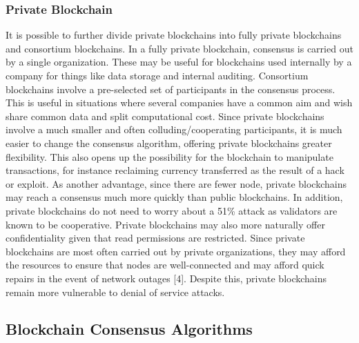 \documentclass[11pt]{article}
\begin{document}
\subsubsection{Private Blockchain}
\label{sec:orga1ba3cc}
It is possible to further divide private blockchains into fully private blockchains and consortium blockchains. In a fully private blockchain, consensus is carried out by a single organization. These may be useful for blockchains used internally by a company for things like data storage and internal auditing. Consortium blockchains involve a pre-selected set of participants in the consensus process. This is useful in situations where several companies have a common aim and wish share common data and split computational cost. Since private blockchains involve a much smaller and often colluding/cooperating participants, it is much easier to change the consensus algorithm, offering private blockchains greater flexibility. This also opens up the possibility for the blockchain to manipulate transactions, for instance reclaiming currency transferred as the result of a hack or exploit. As another advantage, since there are fewer node, private blockchains may reach a consensus much more quickly than public blockchains. In addition, private blockchains do not need to worry about a 51\% attack as validators are known to be cooperative. Private blockchains may also more naturally offer confidentiality given that read permissions are restricted. Since private blockchains are most often carried out by private organizations, they may afford the resources to ensure that nodes are well-connected and may afford quick repairs in the event of network outages [4]. Despite this, private blockchains remain more vulnerable to denial of service attacks. 
\subsection{Blockchain Consensus Algorithms}
\label{sec:org58da4c3}
\end{document}
